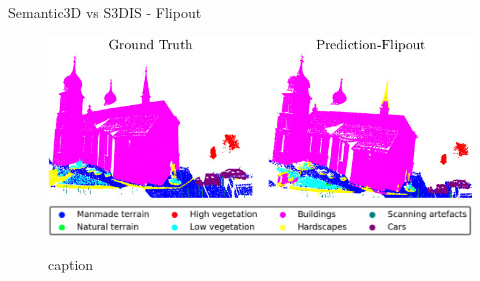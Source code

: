 \documentclass[aspectratio=169]{beamer}
\begin{document}
\begin{frame}{Semantic3D vs S3DIS - Flipout}
    \begin{figure}
        \centering
        \includegraphics[scale=0.5]{images/sem3d/Sem3d_Fout_op.jpg}
        \includegraphics[scale=0.25]{images/legend.jpg}
        \caption{caption}
        \label{fig:sem3d_fout_op}
    \end{figure}
\end{frame}
\end{document}
